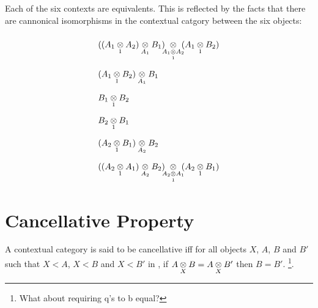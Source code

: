 \documentclass[10pt,a4paper]{scrartcl}
\begin{document}
Each of the six contexts are equivalents. This is reflected by the facts that there are cannonical 
isomorphisms in the contextual catgory between the six objects: \\
\begin{displaymath}
\def\arraystretch{2.2}
\begin{array} {l}
      \crossx
          {(\crossx
			       {(\crossx{A_1}{A_2}{1})}
						 {B_1}
						 {A_1}
			     ) 
			     \hspace{-0.2cm}
					}
					{\hspace{-0.2cm}(\crossx{A_1}{B_2}{1})}
					{\crossx{A_1}{A_2}{1}}
\\
    \crossx
       {(\crossx{A_1}{B_2}{1})}
							{B_1}
							{A_1}
\\

     \crossx{B_1}{B_2}{1}
\\
     \crossx{B_2}{B_1}{1}
\\
     \crossx
           {(\crossx{A_2}{B_1}{1})}
					 {B_2}
					 {A_2}
\\
     \crossx
              {(\crossx
							     {(\crossx{A_2}{A_1}{1})}
									 {B_2}
									 {A_2}
								) 
								\hspace{-0.2cm}
							}
							{\hspace{-0.2cm}(\crossx{A_2}{B_1}{1})}
							{\crossx{A_2}{A_1}{1}} 

\end{array}
\end{displaymath}
\section{Cancellative Property}
\noindent 
\begin{definition}
A contextual category \ccat is said to be cancellative iff for all objects $X$, $A$, $B$ and $B'$ such that
$X < A$, $X < B$ and $X < B'$ in \ccat, 
if $\crossx{A}{B}{X} = \crossx{A}{B'}{X}$ then $B=B'$. \footnote{What about requiring q's to b equal?}.
\end{definition} 





\end{document}

